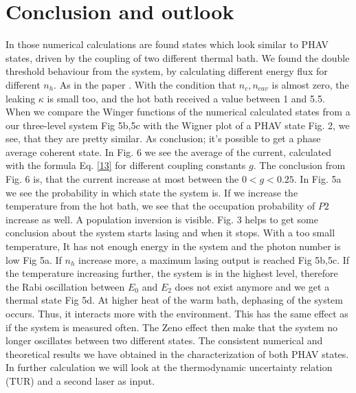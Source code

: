 \documentclass[12pt,a4paper]{article}
\begin{document}
\newpage
\section{Conclusion and outlook}
In those numerical calculations are found states which  look similar to PHAV states, driven by the coupling of two different thermal bath. We found the double threshold behaviour from the system, by calculating different energy flux for different $n_h$. As in the paper \cite{Li2017}.
With the condition that $n_c, n_{cav}$ is almost zero, the leaking $\kappa$ is small too, and the hot bath received a value between 1 and 5.5. When we compare the Winger functions of the numerical calculated states from a our three-level system Fig 5b,5c with the Wigner plot of a PHAV state Fig. 2, we see, that they are pretty similar. As conclusion; it's possible to get a phase average coherent state. 
In Fig. 6 we see the average of the current, calculated with the formula Eq. \eqref{13} for different coupling constants $g$.
The conclusion from Fig. 6 is, that the current increase at most between the $ 0<g<0.25$.
In Fig. 5a we see the probability in which state the  system is. If we increase the temperature from the hot bath, we see that the occupation probability of $P2$ increase as well. A  population  inversion is visible.
Fig. 3 helps to get some conclusion about the system starts lasing and when it stops. With a too small temperature, It has not enough energy in the system and the photon number is low Fig 5a. If $n_h$ increase more, a maximum lasing output is reached  Fig 5b,5c. If the temperature increasing further, the system is in the highest level, therefore the Rabi oscillation between $E_0$ and $E_2$ does not exist anymore and we get a thermal state Fig 5d.
At higher heat of the warm bath, dephasing of the system occurs. Thus, it interacts more with the environment. This has the same effect as if the system is measured often. The Zeno effect then make that the system no longer oscillates between two different states. 
The consistent numerical and theoretical results we have obtained in the characterization of both PHAV states.
In further calculation  we will look at the thermodynamic uncertainty relation (TUR) and a second laser as input.
%
\printbibliography
\end{document}
